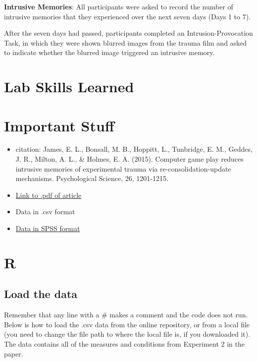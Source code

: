 \documentclass[
]{book}
\providecommand{\tightlist}{%
  \setlength{\itemsep}{0pt}\setlength{\parskip}{0pt}}
\begin{document}
\textbf{Intrusive Memories}: All participants were asked to record the number of intrusive memories that they experienced over the next seven days (Days 1 to 7).

After the seven days had passed, participants completed an Intrusion-Provocation Task, in which they were shown blurred images from the trauma film and asked to indicate whether the blurred image triggered an intrusive memory.

\hypertarget{lab-skills-learned-2}{%
\section{Lab Skills Learned}\label{lab-skills-learned-2}}

\hypertarget{important-stuff-2}{%
\section{Important Stuff}\label{important-stuff-2}}

\begin{itemize}
\tightlist
\item
  citation: James, E. L., Bonsall, M. B., Hoppitt, L., Tunbridge, E. M., Geddes, J. R., Milton, A. L., \& Holmes, E. A. (2015). Computer game play reduces intrusive memories of experimental trauma via re-consolidation-update mechanisms. Psychological Science, 26, 1201-1215.
\item
  \href{http://journals.sagepub.com/stoken/default+domain/hQ2W4fbPrZVJ7eyNJaqu/full}{Link to .pdf of article}
\item
  Data in .csv format
\item
  \href{https://drive.google.com/file/d/0Bz-rhZ21ShvOZ1lvQ0dQekZGWU0/view?usp=sharing}{Data in SPSS format}
\end{itemize}

\hypertarget{r-7}{%
\section{R}\label{r-7}}

\hypertarget{load-the-data-2}{%
\subsection{Load the data}\label{load-the-data-2}}

Remember that any line with a \# makes a comment and the code does not run. Below is how to load the .csv data from the online repository, or from a local file (you need to change the file path to where the local file is, if you downloaded it). The data contains all of the measures and conditions from Experiment 2 in the paper.
\end{document}
